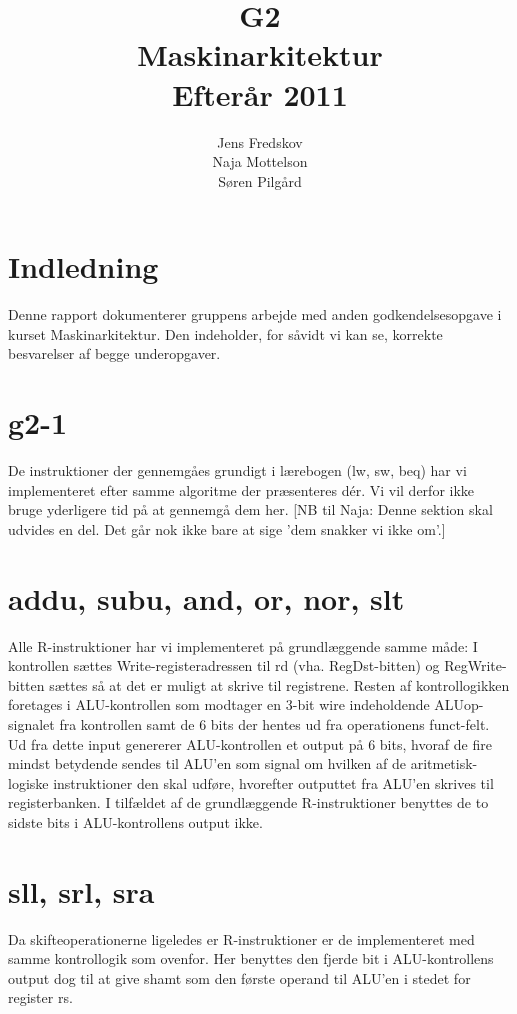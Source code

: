 \documentclass[10pt,a4paper,danish]{article}
\title{G2\\Maskinarkitektur\\Efterår 2011}
\author{Jens Fredskov\\ Naja Mottelson\\Søren Pilgård}
\begin{document}
\maketitle
\newpage

\tableofcontents
\newpage

\section{Indledning}
Denne rapport dokumenterer gruppens arbejde med anden godkendelsesopgave i kurset Maskinarkitektur. Den indeholder, for såvidt vi kan se, korrekte besvarelser af begge underopgaver. 

\section{g2-1}
De instruktioner der gennemgåes grundigt i lærebogen (lw, sw, beq) har vi implementeret efter samme algoritme der præsenteres dér. Vi vil derfor ikke bruge yderligere tid på at gennemgå dem her. [NB til Naja: Denne sektion skal udvides en del. Det går nok ikke bare at sige 'dem snakker vi ikke om'.]

\section{addu, subu, and, or, nor, slt}
Alle R-instruktioner har vi implementeret på grundlæggende samme måde: I kontrollen sættes Write-registeradressen til rd (vha. RegDst-bitten) og RegWrite-bitten sættes så at det er muligt at skrive til registrene. Resten af kontrollogikken foretages i ALU-kontrollen som modtager en 3-bit wire indeholdende ALUop-signalet fra kontrollen samt de 6 bits der hentes ud fra operationens funct-felt. Ud fra dette input genererer ALU-kontrollen et output på 6 bits, hvoraf de fire mindst betydende sendes til ALU'en som signal om hvilken af de aritmetisk-logiske instruktioner den skal udføre, hvorefter outputtet fra ALU'en skrives til registerbanken. I tilfældet af de grundlæggende R-instruktioner benyttes de to sidste bits i ALU-kontrollens output ikke. 

\section{sll, srl, sra}
Da skifteoperationerne ligeledes er R-instruktioner er de implementeret med samme kontrollogik som ovenfor. Her benyttes den fjerde bit i ALU-kontrollens output dog til at give shamt som den første operand til ALU'en i stedet for register rs. 
\end{document}
